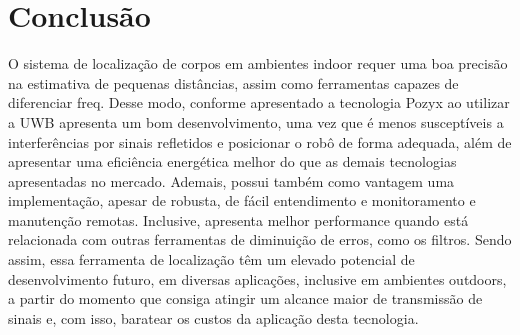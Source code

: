 \chapter{Conclusão}
\label{chap:conc}

O sistema de localização de corpos em ambientes indoor requer uma boa precisão na estimativa de pequenas distâncias, assim como ferramentas capazes de diferenciar freq. Desse modo, conforme apresentado a tecnologia Pozyx ao utilizar a UWB apresenta um bom desenvolvimento, uma vez que é menos susceptíveis a interferências por sinais refletidos e posicionar o robô de forma adequada, além de apresentar uma eficiência energética melhor do que as demais tecnologias apresentadas no mercado. Ademais, possui também como vantagem uma implementação, apesar de robusta, de fácil entendimento e monitoramento e manutenção remotas. Inclusive, apresenta melhor performance quando está relacionada com outras ferramentas de diminuição de erros, como os filtros. Sendo assim, essa ferramenta de localização têm um elevado potencial de desenvolvimento futuro, em diversas aplicações, inclusive em ambientes outdoors, a partir do momento que consiga atingir um alcance maior de transmissão de sinais e, com isso, baratear os custos da aplicação desta tecnologia.




